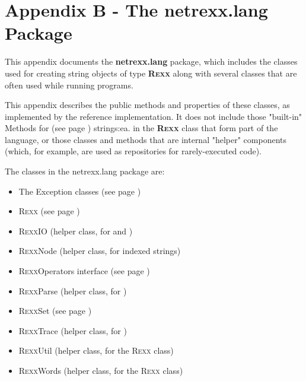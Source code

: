 \chapter{Appendix B - The netrexx.lang Package}\label{refappc}
 
This appendix documents the \textbf{netrexx.lang}
package, which includes the classes used for creating string objects of
type \textbf{R\textsc{exx}} along with several classes that are often used
while running \nr{} programs.
 
This appendix describes the public methods and properties of these
classes, as implemented by the reference implementation.  It does not
include those "built-in"  Methods for \nr{} (see page \pageref{refbmeth}) 
strings:ea. in the \textbf{R\textsc{exx}} class that form part of the
\nr{} language, or those classes and methods that are internal
"helper" components (which, for example, are used as
repositories for rarely-executed code).
 
The classes in the netrexx.lang package are:
\begin{itemize}
\item The  Exception classes (see page \pageref{refnlexcep}) 
\item  R\textsc{exx} (see page \pageref{refnlrexx}) 
\item R\textsc{exx}IO (helper class, for  and )
\item R\textsc{exx}Node (helper class, for indexed strings)
\item  R\textsc{exx}Operators interface (see page \pageref{refnlrops}) 
\item R\textsc{exx}Parse (helper class, for )
\item  R\textsc{exx}Set (see page \pageref{refnlrset}) 
\item R\textsc{exx}Trace (helper class, for )
\item R\textsc{exx}Util (helper class, for the R\textsc{exx} class)
\item R\textsc{exx}Words (helper class, for the R\textsc{exx} class)
\end{itemize}
